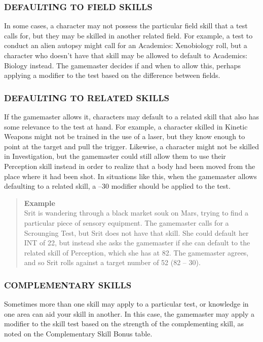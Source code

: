  \subsubsection{DEFAULTING TO FIELD SKILLS}
In some cases, a character may not possess the particular field skill that a test calls for, but they may be
skilled in another related field. For example, a test to
conduct an alien autopsy might call for an Academics:
Xenobiology roll, but a character who doesn’t have
that skill may be allowed to default to Academics:
Biology instead. The gamemaster decides if and when
to allow this, perhaps applying a modifier to the test
based on the difference between fields.


 \subsubsection{DEFAULTING TO RELATED SKILLS}
If the gamemaster allows it, characters may default to
a related skill that also has some relevance to the test
at hand. For example, a character skilled in Kinetic
Weapons might not be trained in the use of a laser, but
they know enough to point at the target and pull the
trigger. Likewise, a character might not be skilled in
Investigation, but the gamemaster could still allow
them to use their Perception skill instead in order to
realize that a body had been moved from the place
where it had been shot. In situations like this, when the
gamemaster allows defaulting to a related skill, a –30
modifier should be applied to the test.

\begin{quotation}
\textbf{Example}
\\
Srit is wandering through a black market souk on
Mars, trying to find a particular piece of sensory
equipment. The gamemaster calls for a Scrounging
Test, but Srit does not have that skill. She could
default her INT of 22, but instead she asks the
gamemaster if she can default to the related skill
of Perception, which she has at 82. The gamemaster agrees, and so Srit rolls against a target number
of 52 (82 – 30).
\end{quotation}




\subsubsection{COMPLEMENTARY SKILLS}
 Sometimes more than one skill may apply to a particular test, or knowledge in one area can aid your skill
 in another. In this case, the gamemaster may apply a
 modifier to the skill test based on the strength of the
 complementing skill, as noted on the Complementary
 Skill Bonus table.


